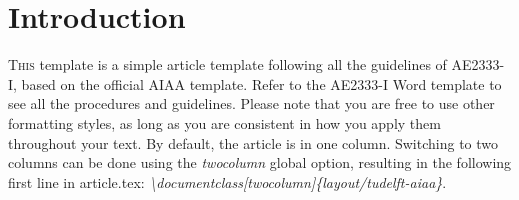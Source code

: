 \section{Introduction}

\lettrine{T}{his} template is a simple article template following all the guidelines of AE2333-I, based on the official AIAA template. Refer to the AE2333-I Word template to see all the procedures and guidelines. Please note that you are free to use other formatting styles, as long as you are consistent in how you apply them throughout your text. By default, the article is in one column. Switching to two columns can be done using the \emph{twocolumn} global option, resulting in the following first line in article.tex: \emph{\textbackslash documentclass[twocolumn]\{layout/tudelft-aiaa\}}.
